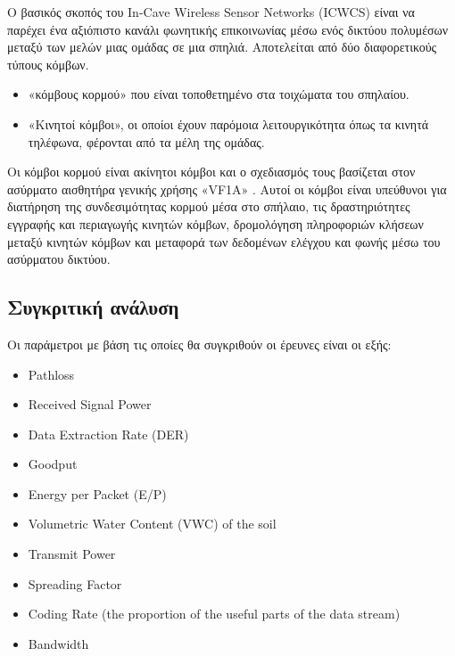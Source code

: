 \documentclass[12pt]{article}
\begin{document}
\begin{multicols*}{2}
        Ο βασικός σκοπός του In-Cave Wireless
        Sensor Networks (ICWCS) είναι να παρέχει ένα αξιόπιστο κανάλι φωνητικής επικοινωνίας
        μέσω ενός δικτύου πολυμέσων μεταξύ των μελών μιας ομάδας σε μια σπηλιά. Αποτελείται
        από δύο διαφορετικούς τύπους κόμβων. 
        \begin{itemize}
            \item «κόμβους κορμού» που είναι τοποθετημένο στα τοιχώματα του σπηλαίου.
            \item «Κινητοί κόμβοι», οι οποίοι έχουν παρόμοια λειτουργικότητα όπως τα κινητά
            τηλέφωνα, φέρονται από τα μέλη της ομάδας.
        \end{itemize}

        Οι κόμβοι κορμού είναι ακίνητοι
        κόμβοι και ο σχεδιασμός τους βασίζεται στον ασύρματο αισθητήρα γενικής
        χρήσης «VF1A» \cite*{walsh_communications_2018}.
        Αυτοί οι κόμβοι είναι υπεύθυνοι για διατήρηση της συνδεσιμότητας κορμού μέσα 
        στο σπήλαιο, τις δραστηριότητες
        εγγραφής και περιαγωγής κινητών κόμβων, δρομολόγηση πληροφοριών κλήσεων μεταξύ
        κινητών κόμβων και μεταφορά των δεδομένων ελέγχου και φωνής μέσω του ασύρματου
        δικτύου.

    \subsection{\normalsize \textsf{Συγκριτική ανάλυση}}
        Οι παράμετροι με βάση τις οποίες θα συγκριθούν οι έρευνες είναι οι εξής:
            \begin{itemize}
                \item Pathloss
                \item Received Signal Power
                \item Data Extraction Rate (DER)
                \item Goodput
                \item Energy per Packet (E/P)
                \item Volumetric Water Content (VWC) of the soil
                \item Transmit Power
                \item Spreading Factor
                \item Coding Rate (the proportion of the useful
                parts of the data stream)
                \item Bandwidth
            \end{itemize}


\end{multicols*}
\end{document}
